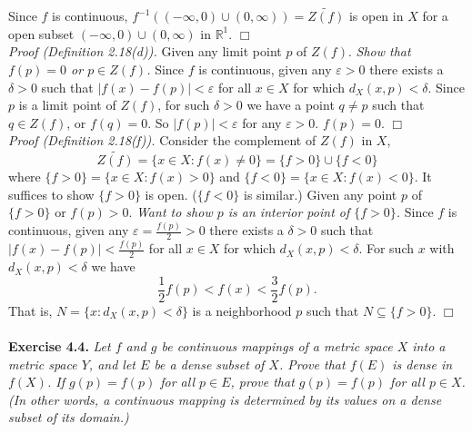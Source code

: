 \documentclass{article}
\begin{document}
Since $f$ is continuous, $f^{-1}((-\infty, 0) \cup (0, \infty)) = \widetilde{Z(f)}$
is open in $X$ for a open subset $(-\infty, 0) \cup (0, \infty)$ in $\mathbb{R}^1$.
$\Box$ \\

\emph{Proof (Definition 2.18(d)).}
Given any limit point $p$ of $Z(f)$.
\emph{Show that $f(p) = 0$ or $p \in Z(f)$.}
Since $f$ is continuous, given any $\varepsilon > 0$ there exists a $\delta > 0$
such that $|f(x) - f(p)| < \varepsilon$ for all $x \in X$ for which $d_X(x, p) < \delta$.
Since $p$ is a limit point of $Z(f)$, for such $\delta > 0$ we have a point $q \neq p$
such that $q \in Z(f)$, or $f(q) = 0$. So $|f(p)| < \varepsilon$ for any $\varepsilon > 0$.
$f(p) = 0$.
$\Box$ \\

\emph{Proof (Definition 2.18(f)).}
Consider the complement of $Z(f)$ in $X$,
$$\widetilde{Z(f)} = \{ x \in X : f(x) \neq 0 \} = \{f > 0\} \cup \{f < 0\}$$
where $\{f > 0\} = \{ x \in X : f(x) > 0 \}$ and $\{f < 0\} = \{ x \in X : f(x) < 0 \}$.
It suffices to show $\{f > 0\}$ is open. ($\{f < 0\}$ is similar.)
Given any point $p$ of $\{f > 0\}$ or $f(p) > 0$.
\emph{Want to show $p$ is an interior point of $\{f > 0\}$.}
Since $f$ is continuous, given any $\varepsilon = \frac{f(p)}{2} > 0$
there exists a $\delta > 0$
such that $|f(x) - f(p)| < \frac{f(p)}{2}$ for all $x \in X$ for which $d_X(x, p) < \delta$.
For such $x$ with $d_X(x, p) < \delta$ we have
$$\frac{1}{2}f(p) < f(x) < \frac{3}{2}f(p).$$
That is, $N = \{ x : d_X(x, p) < \delta \}$ is a neighborhood $p$ such that
$N \subseteq \{f > 0\}$.
$\Box$ \\\\






\textbf{Exercise 4.4.}
\emph{Let $f$ and $g$ be continuous mappings of a metric space $X$ into a metric space $Y$,
and let $E$ be a dense subset of $X$.
Prove that $f(E)$ is dense in $f(X)$.
If $g(p) = f(p)$ for all $p \in E$, prove that $g(p) = f(p)$ for all $p \in X$.
(In other words, a continuous mapping is determined by
its values on a dense subset of its domain.)} \\
\end{document}
